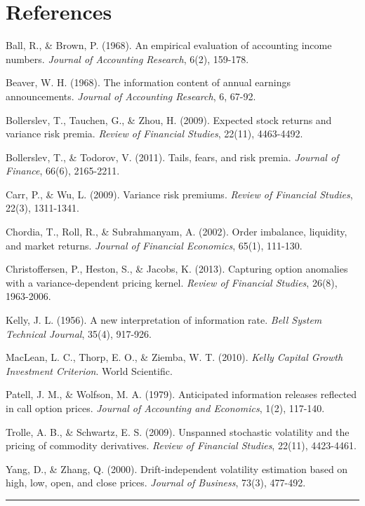 \documentclass[
  american,
  11pt,
  11pt,
  letterpaper,
  onecolumn]{article}
\begin{document}
\section{References}\label{references}

Ball, R., \& Brown, P. (1968). An empirical evaluation of accounting
income numbers. \emph{Journal of Accounting Research}, 6(2), 159-178.

Beaver, W. H. (1968). The information content of annual earnings
announcements. \emph{Journal of Accounting Research}, 6, 67-92.

Bollerslev, T., Tauchen, G., \& Zhou, H. (2009). Expected stock returns
and variance risk premia. \emph{Review of Financial Studies}, 22(11),
4463-4492.

Bollerslev, T., \& Todorov, V. (2011). Tails, fears, and risk premia.
\emph{Journal of Finance}, 66(6), 2165-2211.

Carr, P., \& Wu, L. (2009). Variance risk premiums. \emph{Review of
Financial Studies}, 22(3), 1311-1341.

Chordia, T., Roll, R., \& Subrahmanyam, A. (2002). Order imbalance,
liquidity, and market returns. \emph{Journal of Financial Economics},
65(1), 111-130.

Christoffersen, P., Heston, S., \& Jacobs, K. (2013). Capturing option
anomalies with a variance-dependent pricing kernel. \emph{Review of
Financial Studies}, 26(8), 1963-2006.

Kelly, J. L. (1956). A new interpretation of information rate.
\emph{Bell System Technical Journal}, 35(4), 917-926.

MacLean, L. C., Thorp, E. O., \& Ziemba, W. T. (2010). \emph{Kelly
Capital Growth Investment Criterion}. World Scientific.

Patell, J. M., \& Wolfson, M. A. (1979). Anticipated information
releases reflected in call option prices. \emph{Journal of Accounting
and Economics}, 1(2), 117-140.

Trolle, A. B., \& Schwartz, E. S. (2009). Unspanned stochastic
volatility and the pricing of commodity derivatives. \emph{Review of
Financial Studies}, 22(11), 4423-4461.

Yang, D., \& Zhang, Q. (2000). Drift-independent volatility estimation
based on high, low, open, and close prices. \emph{Journal of Business},
73(3), 477-492.

\begin{center}\rule{0.5\linewidth}{0.5pt}\end{center}
\end{document}
